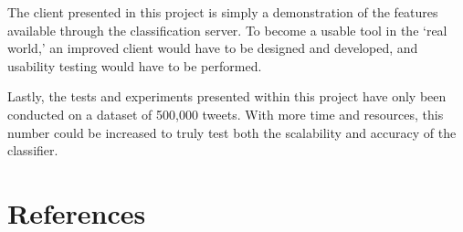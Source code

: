 \documentclass[11pt,a4paper]{report}
\begin{document}
The client presented in this project is simply a demonstration of the features available through the classification server. To become a usable tool in the `real world,' an improved client would have to be designed and developed, and usability testing would have to be performed.

Lastly, the tests and experiments presented within this project have only been conducted on a dataset of 500,000 tweets. With more time and resources, this number could be increased to truly test both the scalability and accuracy of the classifier.

\pagebreak

\chapter*{References}
\printbibliography[heading=none]
\end{document}
